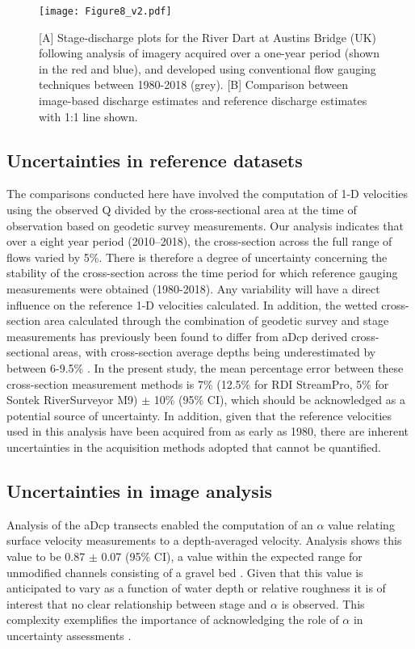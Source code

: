 \documentclass[hess, manuscript]{copernicus} %
\begin{document}
\begin{figure*}[!htb]
\centering 
\texttt{[image: Figure8\_v2.pdf]}
\caption{[A] Stage-discharge plots for the River Dart at Austins Bridge (UK) following analysis of imagery acquired over a one-year period (shown in the red and blue), and developed using conventional flow gauging techniques between 1980-2018 (grey). [B] Comparison between image-based discharge estimates and reference discharge estimates with 1:1 line shown.}
\label{Figure8} 
\end{figure*}

\subsection{Uncertainties in reference datasets}
The comparisons conducted here have involved the computation of 1-D velocities using the observed Q divided by the cross-sectional area at the time of observation based on geodetic survey measurements. Our analysis indicates that over a eight year period (2010--2018), the cross-section across the full range of flows varied by 5\%. There is therefore a degree of uncertainty concerning the stability of the cross-section across the time period for which reference gauging measurements were obtained (1980-2018). Any variability will have a direct influence on the reference 1-D velocities calculated. In addition, the wetted cross-section area calculated through the combination of geodetic survey and stage measurements has previously been found to differ from aDcp derived cross-sectional areas, with cross-section average depths being underestimated by between 6-9.5\% \citep{Kim2015}. In the present study, the mean percentage error between these cross-section measurement methods is 7\% (12.5\% for RDI StreamPro, 5\% for Sontek RiverSurveyor M9) $\pm$ 10\% (95\% CI), which should be acknowledged as a potential source of uncertainty. In addition, given that the reference velocities used in this analysis have been acquired from as early as 1980, there are inherent uncertainties in the acquisition methods adopted that cannot be quantified.

\subsection{Uncertainties in image analysis}
\label{Discussion: image uncertainty}
Analysis of the aDcp transects enabled the computation of an $\alpha$ value relating surface velocity measurements to a depth-averaged velocity. Analysis shows this value to be 0.87 $\pm$ 0.07 (95\% CI), a value within the expected range for unmodified channels consisting of a gravel bed \citep{turnipseed2010discharge}. Given that this value is anticipated to vary as a function of water depth or relative roughness it is of interest that no clear relationship between stage and $\alpha$ is observed. This complexity exemplifies the importance of acknowledging the role of $\alpha$ in uncertainty assessments \citep{hauet2018velocity}.
\end{document}
